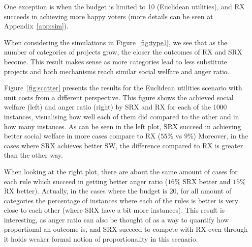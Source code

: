 \documentclass[runningheads]{llncs}
\begin{document}



One exception is when the budget is limited to 10 (Euclidean utilities), and RX succeeds in achieving  more happy voters (more details can be seen at Appendix~\ref{app:sim}).

When considering the   simulations in Figure~\ref{fig:type1}, we   see that as the number of categories of projects grow, the closer  the outcomes of RX and SRX become. This result makes sense as  more categories lead to  less  substitute projects and both mechanisms reach similar social welfare and anger ratio. 

Figure~\ref{fig:scatter} presents the results for the Euclidean utilities scenario with unit costs from a different perspective. This figure shows the achieved social welfare (left) and anger ratio (right) by SRX and RX for each of the 1000 instances, visualising how well each of them did compared to the other and in how many instances. As can be seen in the left plot, SRX succeed in achieving better social welfare in more cases compare to RX ($55\%$ vs $9\%$) Moreover, in the cases where SRX achieves better SW, the difference compared to RX is greater than the other way.

When looking at the right plot, there are about the same amount of cases for each rule which succeed in getting better anger ratio ($16\%$ SRX better and $15\%$ RX better). Actually, in the cases where the budget is 20, for all amount of categories the percentage of instances where each of the rules is better is very close to each other (where SRX have a bit more instances). This result is interesting, as anger ratio can also be thought of as a way to quantify how proportional an outcome is, and SRX succeed to compete with RX even through it holds weaker formal notion of proportionality in this scenario.
\end{document}

